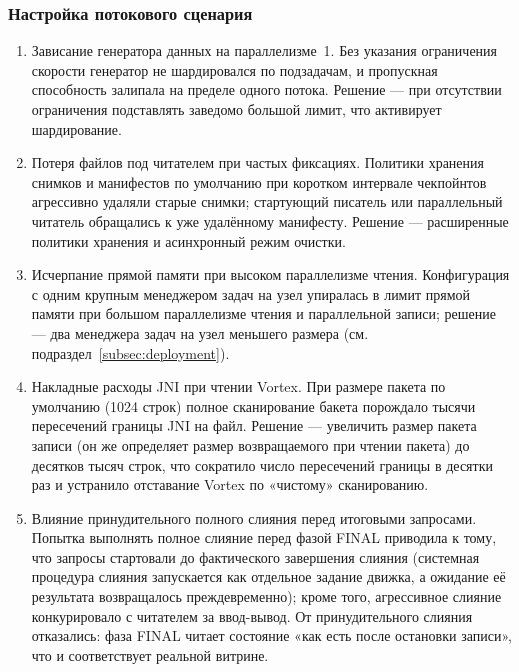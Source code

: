 \subsubsection{Настройка потокового сценария}

\begin{enumerate}
    \item Зависание генератора данных на параллелизме~1. Без указания
        ограничения скорости генератор не шардировался по подзадачам, и пропускная
        способность залипала на пределе одного потока. Решение --- при отсутствии
        ограничения подставлять заведомо большой лимит, что активирует шардирование.
    \item Потеря файлов под читателем при частых фиксациях. Политики
        хранения снимков и манифестов по умолчанию при коротком интервале чекпойнтов
        агрессивно удаляли старые снимки; стартующий писатель или параллельный
        читатель обращались к уже удалённому манифесту. Решение --- расширенные
        политики хранения и асинхронный режим очистки.
    \item Исчерпание прямой памяти при высоком параллелизме чтения.
        Конфигурация с одним крупным менеджером задач на узел упиралась в лимит
        прямой памяти при большом параллелизме чтения и параллельной записи; решение
        --- два менеджера задач на узел меньшего размера (см.
        подраздел~\ref{subsec:deployment}).
    \item Накладные расходы JNI при чтении Vortex. При размере пакета по
        умолчанию (\num{1024} строк) полное сканирование бакета порождало тысячи
        пересечений границы JNI на файл. Решение --- увеличить размер пакета записи
        (он же определяет размер возвращаемого при чтении пакета) до десятков тысяч
        строк, что сократило число пересечений границы в десятки раз и устранило
        отставание Vortex по «чистому» сканированию.
    \item Влияние принудительного полного слияния перед итоговыми запросами.
        Попытка выполнять полное слияние перед фазой FINAL приводила к тому, что
        запросы стартовали до фактического завершения слияния (системная процедура
        слияния запускается как отдельное задание движка, а ожидание её результата
        возвращалось преждевременно); кроме того, агрессивное слияние конкурировало с
        читателем за ввод-вывод. От принудительного слияния отказались: фаза FINAL
        читает состояние «как есть после остановки записи», что и соответствует
        реальной витрине.
\end{enumerate}

